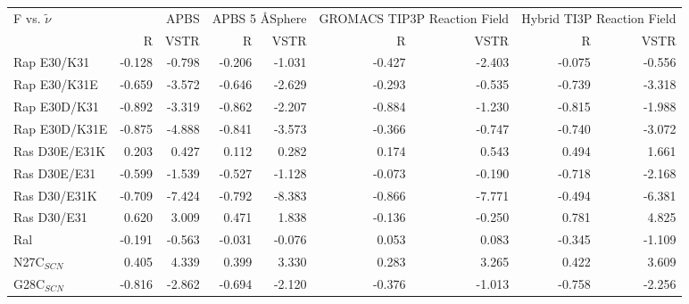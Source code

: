 \documentclass[]{article}
\begin{document}
{
\begin{tabular}{ l || r r| r r| r r| r r}
F vs. $\tilde \nu$ & \multicolumn{2}{|C{2cm}}{APBS} & \multicolumn{2}{|C{2cm}}{APBS 5 \AA  Sphere} & \multicolumn{2}{|C{2cm}}{GROMACS TIP3P Reaction Field} & \multicolumn{2}{|C{2cm}}{Hybrid TI3P Reaction Field} \\
 & \multicolumn{1}{|C{1cm}}{R} & \multicolumn{1}{C{1cm}}{VSTR} & \multicolumn{1}{|C{1cm}}{R} & \multicolumn{1}{C{1cm}}{VSTR} & \multicolumn{1}{|C{1cm}}{R} & \multicolumn{1}{C{1cm}}{VSTR} & \multicolumn{1}{|C{1cm}}{R} & \multicolumn{1}{C{1cm}}{VSTR} \\
\hline\hline
Rap E30/K31    & -0.128         & -0.798         & -0.206         & -1.031         & -0.427         & -2.403         & -0.075         & -0.556        \\
Rap E30/K31E   & -0.659         & -3.572         & -0.646         & -2.629         & -0.293         & -0.535         & -0.739         & -3.318        \\
Rap E30D/K31   & -0.892         & -3.319         & -0.862         & -2.207         & -0.884         & -1.230         & -0.815         & -1.988        \\
Rap E30D/K31E  & -0.875         & -4.888         & -0.841         & -3.573         & -0.366         & -0.747         & -0.740         & -3.072        \\
Ras D30E/E31K  & 0.203          & 0.427          & 0.112          & 0.282          & 0.174          & 0.543          & 0.494          & 1.661         \\
Ras D30E/E31   & -0.599         & -1.539         & -0.527         & -1.128         & -0.073         & -0.190         & -0.718         & -2.168        \\
Ras D30/E31K   & -0.709         & -7.424         & -0.792         & -8.383         & -0.866         & -7.771         & -0.494         & -6.381        \\
Ras D30/E31    & 0.620          & 3.009          & 0.471          & 1.838          & -0.136         & -0.250         & 0.781          & 4.825         \\
Ral            & -0.191         & -0.563         & -0.031         & -0.076         & 0.053          & 0.083          & -0.345         & -1.109        \\
\hline
N27C$_{SCN}$   & 0.405          & 4.339          & 0.399          & 3.330          & 0.283          & 3.265          & 0.422          & 3.609         \\
G28C$_{SCN}$   & -0.816         & -2.862         & -0.694         & -2.120         & -0.376         & -1.013         & -0.758         & -2.256        \\

\end{tabular}}
\end{document}
